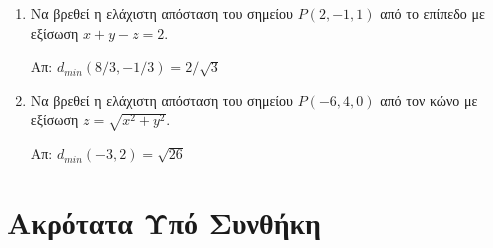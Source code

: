 \documentclass[a4paper,table]{report}
\begin{document}
\begin{enumerate}
  \item Να βρεθεί η ελάχιστη απόσταση του σημείου $ P(2,-1,1) $ από το επίπεδο με 
    εξίσωση $ x+y-z=2 $. 
    
    \hfill Απ: $ d_{min}(8/3,-1/3) = 2 /\sqrt{3} $ 

  \item Να βρεθεί η ελάχιστη απόσταση του σημείου $ P(-6,4,0) $ από τον κώνο με 
    εξίσωση $ z = \sqrt{x^{2}+y^{2}} $. 
    
    \hfill Απ: $ d_{min}(-3,2) = \sqrt{26} $ 

\end{enumerate}


\section*{Ακρότατα Υπό Συνθήκη}
\end{document}
